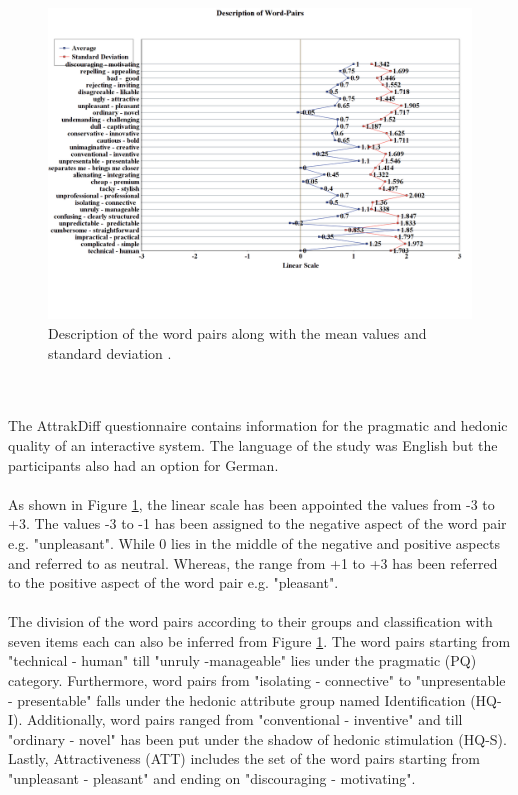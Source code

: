 \begin{figure}[!h]
    \centering
    \includegraphics[width=1\textwidth]{img/Desc_of_Word_Pairs_Updated.png}
    \caption{Description of the word pairs along with the mean values and standard deviation \cite{attrakdiff}.}
    \label{fig:descofWordPair}
\end{figure}
\\~\\
The AttrakDiff questionnaire contains information for the pragmatic and hedonic quality of an interactive system. The language of the study was English but the participants also had an option for German.
\\~\\
As shown in Figure \ref{fig:descofWordPair}, the linear scale has been appointed the values from -3 to +3. The values -3 to -1 has been assigned to the negative aspect of the word pair e.g. "unpleasant". While 0 lies in the middle of the negative and positive aspects and referred to as neutral. Whereas, the range from +1 to +3 has been referred to the positive aspect of the word pair e.g. "pleasant".
\\~\\
The division of the word pairs according to their groups and classification with seven items each can also be inferred from Figure \ref{fig:descofWordPair}. The word pairs starting from "technical - human" till "unruly -manageable" lies under the pragmatic (PQ) category. Furthermore, word pairs from "isolating - connective" to "unpresentable - presentable" falls under the hedonic attribute group named Identification (HQ-I). Additionally, word pairs ranged from "conventional - inventive" and till "ordinary - novel" has been put under the shadow of hedonic stimulation (HQ-S). Lastly, Attractiveness (ATT) includes the set of the word pairs starting from "unpleasant - pleasant" and ending on "discouraging - motivating". 
